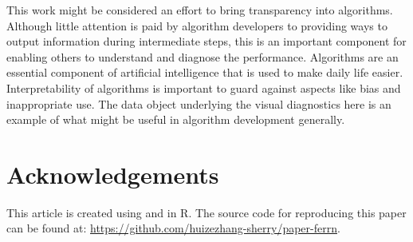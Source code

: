 This work might be considered an effort to bring transparency into
algorithms. Although little attention is paid by algorithm developers to
providing ways to output information during intermediate steps, this is
an important component for enabling others to understand and diagnose
the performance. Algorithms are an essential component of artificial
intelligence that is used to make daily life easier. Interpretability of
algorithms is important to guard against aspects like bias and
inappropriate use. The data object underlying the visual diagnostics
here is an example of what might be useful in algorithm development
generally.

\hypertarget{acknowledgements}{%
\section{Acknowledgements}\label{acknowledgements}}

This article is created using  \citep{knitr} and
 \citep{rmarkdown} in R. The source code for
reproducing this paper can be found at:
\url{https://github.com/huizezhang-sherry/paper-ferrn}.



\address{%
H. Sherry Zhang\\
Monash University\\%
Department of Econometrics and Business Statistics\\ Melbourne,
Australia\\
%
%
%
\href{mailto:huize.zhang@monash.edu}{\nolinkurl{huize.zhang@monash.edu}}%
}

\address{%
Dianne Cook\\
Monash University\\%
Department of Econometrics and Business Statistics\\ Melbourne,
Australia\\
%
%
%
\href{mailto:dicook@monash.edu}{\nolinkurl{dicook@monash.edu}}%
}

\address{%
Ursula Laa\\
University of Natural Resources and Life Sciences\\%
Institute of Statistics\\ Vienna, Austria\\
%
%
%
\href{mailto:ursula.laa@boku.ac.at}{\nolinkurl{ursula.laa@boku.ac.at}}%
}

\address{%
Nicolas Langrené\\
CSIRO Data61\\%
34 Village Street, Docklands VIC 3008 Australia\\ Melbourne, Australia\\
%
%
%
\href{mailto:nicolas.langrene@csiro.au}{\nolinkurl{nicolas.langrene@csiro.au}}%
}

\address{%
Patricia Menéndez\\
Monash University\\%
Department of Econometrics and Business Statistics\\ Melbourne,
Australia\\
%
%
%
\href{mailto:patricia.menendez@monash.edu}{\nolinkurl{patricia.menendez@monash.edu}}%
}
